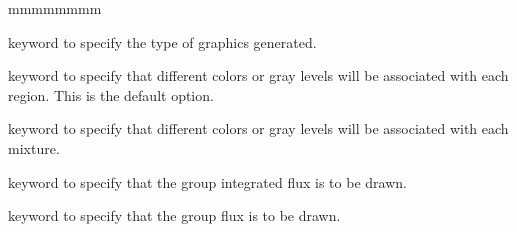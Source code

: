 \begin{ListeDeDescription}{mmmmmmmm}
\item[\moc{TYPE}] keyword to specify the type of graphics generated. 

\item[\moc{REGION}] keyword to specify that different colors or gray levels will be associated with each region. This 
is the default option. 

\item[\moc{MIXTURE}] keyword to specify that different colors or gray levels will be associated with each mixture. 

\item[\moc{FLUX}] keyword to specify that the group integrated flux is to be drawn. 

\item[\moc{MGFLUX}] keyword to specify that the group flux is to be drawn.

\end{ListeDeDescription}
